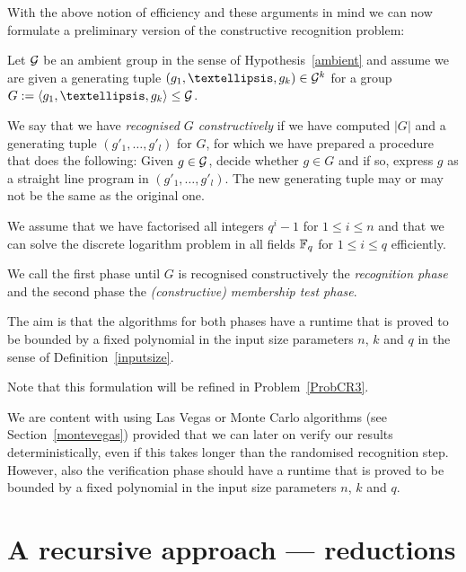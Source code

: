 With the above notion of efficiency and these arguments in mind we can now 
formulate a preliminary version of the constructive recognition problem:

\begin{Problem}
\label{ProbCR2}
Let $\mathcal{G}$ be an ambient group in the sense of Hypothesis~\ref{ambient} and 
assume we are given a generating tuple $(g_1, \ldots, g_k) \in
\GG^k$ for a group $G := \left< g_1, \ldots, g_k \right> \le \GG$. 

We say that we have \emph{recognised $G$ constructively} if we have 
computed $|G|$ and a
generating tuple $( g'_1, \ldots, g'_l )$ for $G$, for which we have
prepared a procedure that does the following: Given $g \in \mathcal{G}$,
decide whether $g \in G$ and if so, express $g$ as a straight line program
in $(g'_1, \ldots, g'_l)$. The new generating tuple may or may not be the
same as the original one.

We assume that we have factorised all integers $q^i-1$ for $1 \le i \le n$
and that we can solve the discrete logarithm problem in all fields $\mathbb{F}_q$
for $1 \le i \le q$ efficiently. 

We call the first phase until $G$ is
recognised constructively the \emph{recognition phase} and the second
phase the \emph{(constructive) membership test phase}.

The aim is that the algorithms for both phases have a runtime that is proved
to be bounded by a fixed polynomial in the input size parameters $n$, $k$
and $q$ in the sense of Definition~\ref{inputsize}.
\proofend
\end{Problem}

Note that this formulation will be refined in Problem~\ref{ProbCR3}.

\begin{Rem}
We are content with using Las Vegas or Monte Carlo algorithms (see
Section~\ref{montevegas}) provided that we can later on verify our results
deterministically, even if this takes longer than the randomised
recognition step. However, also the verification phase should have a
runtime that is proved to be bounded by a fixed polynomial in the input
size parameters $n$, $k$ and $q$.
\end{Rem}

\section{A recursive approach --- reductions}
\label{recapproach}

